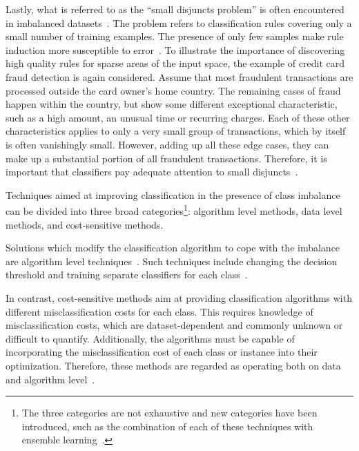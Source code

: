 \documentclass[sort&compress]{elsarticle}
\begin{document}
Lastly, what is referred to as the ``small disjuncts problem'' is often
encountered in imbalanced datasets~\citep{Galar.2012}. The problem refers to
classification rules covering only a small number of training examples. The
presence of only few samples make rule induction more susceptible to
error~\citep{Holte.1989}. To illustrate the importance of discovering high
quality rules for sparse areas of the input space, the example of credit card
fraud detection is again considered. Assume that most fraudulent transactions
are processed outside the card owner's home country. The remaining cases of
fraud happen within the country, but show some different exceptional
characteristic, such as a high amount, an unusual time or recurring charges.
Each of these other characteristics applies to only a very small group of
transactions, which by itself is often vanishingly small. However, adding up all
these edge cases, they can make up a substantial portion of all fraudulent
transactions. Therefore, it is important that classifiers pay adequate attention
to small disjuncts~\citep{Holte.1989}.

Techniques aimed at improving classification in the presence of class imbalance
can be divided into three broad categories\footnote{The three categories are not
exhaustive and new categories have been introduced, such as the combination of
each of these techniques with ensemble
learning~\citep{Galar.2012,Diez-pastor.2015,Galar.2016}.}: algorithm level
methods, data level methods, and cost-sensitive methods.

Solutions which modify the classification algorithm to cope with the imbalance
are algorithm level techniques~\citep{Kotsiantis.2006,Galar.2012}. Such
techniques include changing the decision threshold and training separate
classifiers for each class~\citep{Kotsiantis.2006,Chawla.2004}. 

In contrast, cost-sensitive methods aim at providing classification algorithms
with different misclassification costs for each class. This requires knowledge
of misclassification costs, which are dataset-dependent and commonly unknown or
difficult to quantify. Additionally, the algorithms must be capable of
incorporating the misclassification cost of each class or instance into their
optimization. Therefore, these methods are regarded as operating both on data
and algorithm level~\citep{Galar.2012}.
\end{document}
